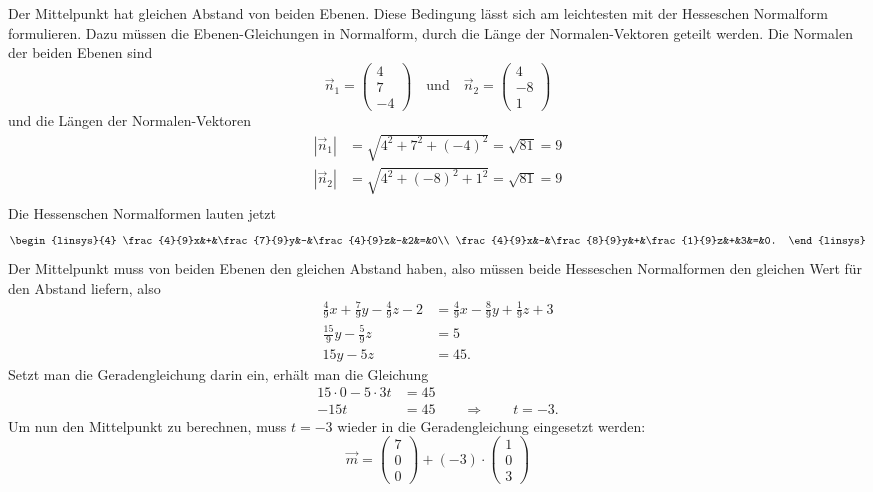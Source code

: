 \begin{loesung}
Der Mittelpunkt hat gleichen Abstand von beiden Ebenen. 
Diese Bedingung lässt sich am leichtesten mit der Hesseschen Normalform
formulieren.
Dazu müssen die Ebenen-Gleichungen in Normalform, durch die Länge der
Normalen-Vektoren geteilt werden. Die Normalen der beiden Ebenen sind
\[
\vec n_1 = \begin{pmatrix}4\\7\\-4\end{pmatrix}\quad \text{und}\quad
\vec n_2 = \begin{pmatrix}4\\-8\\1\end{pmatrix}
\]
und die Längen der Normalen-Vektoren
\begin{align*}
|\vec n_1| &= \sqrt{4^2+7^2+(-4)^2} = \sqrt{81} = 9\\
|\vec n_2| &= \sqrt{4^2+(-8)^2+1^2} = \sqrt{81} = 9\\
\end{align*}
Die Hessenschen Normalformen lauten jetzt
\[
\begin{linsys}{4}
\frac{4}{9}x&+&\frac{7}{9}y&-&\frac{4}{9}z&-&2&=&0\\
\frac{4}{9}x&-&\frac{8}{9}y&+&\frac{1}{9}z&+&3&=&0.
\end{linsys}
\]
Der Mittelpunkt muss von beiden Ebenen den gleichen Abstand haben,
also müssen beide Hesseschen Normalformen den gleichen Wert für den Abstand
liefern, also
\begin{align*}
\frac{4}{9}x+\frac{7}{9}y-\frac{4}{9}z-2&=
\frac{4}{9}x-\frac{8}{9}y+\frac{1}{9}z+3
\\
\frac{15}{9}y-\frac{5}{9}z&=5
\\
15y-5z&=45.
\end{align*}
Setzt man die Geradengleichung darin ein, erhält man die Gleichung
\begin{align*}
15\cdot0-5\cdot3t&=45\\
-15t&=45
\qquad\Rightarrow\qquad t=-3.
\end{align*}
Um nun den Mittelpunkt zu berechnen, muss $t=-3$ wieder 
in die Geradengleichung eingesetzt werden:
\[
\vec m= 
\begin{pmatrix} 7\\0\\0 \end{pmatrix}
+(-3)\cdot
\begin{pmatrix}1\\0\\3\end{pmatrix}
\]
\end{loesung}
